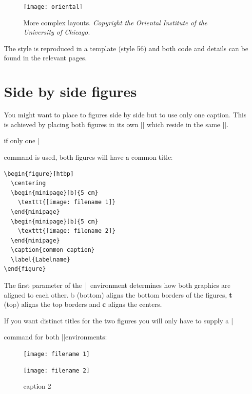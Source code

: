 \begin{figure}[p]
\centering
\texttt{[image: oriental]}
\caption{More complex layouts. \emph{Copyright the Oriental Institute of the University of Chicago.}}
\label{complex}
\end{figure}

The style is reproduced in a  template (style 56) and both code and details can be found in the relevant pages.





\section{Side by side figures}

You might want to place to figures side by side but to use only one caption. This is achieved by placing both figures in its own |\minipage| which reside in the same |\figure|.

if only one |\caption| command is used, both figures will have a common title:

\medskip
\begin{verbatim}
\begin{figure}[htbp]
  \centering
  \begin{minipage}[b]{5 cm}
    \texttt{[image: filename 1]}  
  \end{minipage}
  \begin{minipage}[b]{5 cm}
    \texttt{[image: filename 2]}  
  \end{minipage}
  \caption{common caption}
  \label{Labelname}
\end{figure}
\end{verbatim}
\medskip

The first parameter of the |\minipage| environment determines how both graphics are aligned to each other. b (bottom) aligns the bottom borders of the figures, \textbf{t} (top) aligns the top borders and \textbf{c} aligns the centers.

If you want distinct titles for the two figures you will only have to supply a |\caption| command for both |\minipage|environments:

\begin{teX}
\begin{figure}[htbp]
  \centering
  \begin{minipage}[b]{5 cm}
    \texttt{[image: filename 1]} 
    \caption{caption 1}
    \label{labelname 1}
  \end{minipage}
  \begin{minipage}[b]{5 cm}
    \texttt{[image: filename 2]}  
    \caption{caption 2}
    \label{labelname 2}
  \end{minipage}
\end{figure}
\end{teX}


